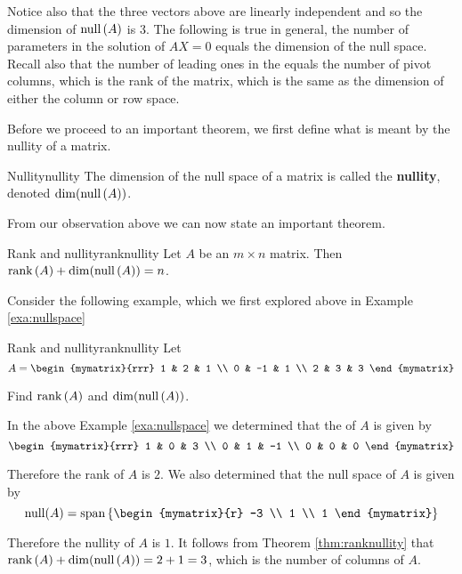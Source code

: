 Notice also that the three vectors above are linearly independent and
so the dimension of $\mbox{null} \left(A\right) $ is 3. The following is
true in general, the number of parameters in the solution of $AX=0$
equals the dimension of the null space. Recall also that the number of
leading ones in the {\rref} equals the number of pivot columns, which is
the rank of the matrix, which is the same as the dimension of either
the column or row space.

Before we proceed to an important theorem, we first define what is meant by the nullity of a matrix. 

\begin{definition}{Nullity}{nullity}
The dimension of the null space of a matrix is called the \textbf{nullity}, denoted $\dim( \mbox{null}\left(A\right))$.
\end{definition}

From our observation above we can now state an important theorem.

\begin{theorem}{Rank and nullity}{ranknullity}
Let $A$ be an $m\times n$ matrix. Then $\mbox{rank}\left(A\right) + \dim( \mbox{null}\left(A\right)) =n$. 
\end{theorem}

Consider the following example, which we first explored above in Example \ref{exa:nullspace}

\begin{example}{Rank and nullity}{ranknullity}
Let
\begin{equation*}
A=\begin{mymatrix}{rrr}
1 & 2 & 1 \\
0 & -1 & 1 \\
2 & 3 & 3
\end{mymatrix} 
\end{equation*}

Find $\mbox{rank}\left(A\right)$ and $\dim( \mbox{null}\left(A\right))$. 
\end{example}

\medskip
\begin{solution}
In the above Example \ref{exa:nullspace} we determined that the {\rref} of $A$ is given by 
\[
\begin{mymatrix}{rrr}
1 & 0 & 3 \\ 
0 & 1 & -1  \\
0 & 0 & 0 
\end{mymatrix}
\]

Therefore the rank of $A$ is $2$. We also determined that the null space of $A$ is given by 
\[
\func{null} (A) = \func{span} \set{\begin{mymatrix}{r}
-3 \\ 
1 \\ 
1
\end{mymatrix}
}
\]

Therefore the nullity of $A$ is $1$. It follows from Theorem \ref{thm:ranknullity} that $\mbox{rank}\left(A\right) + \dim( \mbox{null}\left(A\right)) = 2 + 1 = 3$, which is the number of columns of $A$.
\end{solution} 

